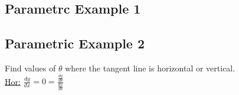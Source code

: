 \documentclass[12pt]{article}
\begin{document}
\subsection{Parametrc Example 1}


\subsection{Parametric Example 2}
Find  values of $\theta$ where the tangent line is horizontal or vertical.\\%
\underline{Hor:} $\frac{dy}{dx}=0=\frac{\frac{dy}{d\theta}}{\frac{dx}{d\theta}}$
\end{document}
